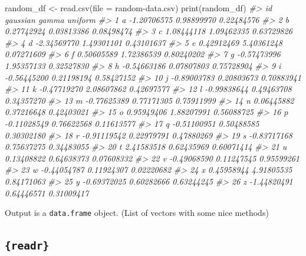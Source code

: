 \documentclass[
  12pt,
]{book}
\newenvironment{Shaded}{\begin{snugshade}}{\end{snugshade}}
\newcommand{\AttributeTok}[1]{\textcolor[rgb]{0.77,0.63,0.00}{#1}}
\newcommand{\CommentTok}[1]{\textcolor[rgb]{0.56,0.35,0.01}{\textit{#1}}}
\newcommand{\FunctionTok}[1]{\textcolor[rgb]{0.00,0.00,0.00}{#1}}
\newcommand{\NormalTok}[1]{#1}
\newcommand{\OtherTok}[1]{\textcolor[rgb]{0.56,0.35,0.01}{#1}}
\newcommand{\StringTok}[1]{\textcolor[rgb]{0.31,0.60,0.02}{#1}}
\begin{document}
\begin{Shaded}
\begin{Highlighting}[]
\NormalTok{random\_df }\OtherTok{\textless{}{-}} \FunctionTok{read.csv}\NormalTok{(}\AttributeTok{file =} \StringTok{\textquotesingle{}random{-}data.csv\textquotesingle{}}\NormalTok{)}
\FunctionTok{print}\NormalTok{(random\_df)}
\CommentTok{\#\textgreater{}    id    gaussian      gamma    uniform}
\CommentTok{\#\textgreater{} 1   a {-}1.20706575 0.98899970 0.22484576}
\CommentTok{\#\textgreater{} 2   b  0.27742924 0.03813386 0.08498474}
\CommentTok{\#\textgreater{} 3   c  1.08444118 1.09462335 0.63729826}
\CommentTok{\#\textgreater{} 4   d {-}2.34569770 1.49301101 0.43101637}
\CommentTok{\#\textgreater{} 5   e  0.42912469 5.40361248 0.07271609}
\CommentTok{\#\textgreater{} 6   f  0.50605589 1.72386539 0.80240202}
\CommentTok{\#\textgreater{} 7   g {-}0.57473996 1.95357133 0.32527830}
\CommentTok{\#\textgreater{} 8   h {-}0.54663186 0.07807803 0.75728904}
\CommentTok{\#\textgreater{} 9   i {-}0.56445200 0.21198194 0.58427152}
\CommentTok{\#\textgreater{} 10  j {-}0.89003783 0.20803673 0.70883941}
\CommentTok{\#\textgreater{} 11  k {-}0.47719270 2.08607862 0.42697577}
\CommentTok{\#\textgreater{} 12  l {-}0.99838644 0.49463708 0.34357270}
\CommentTok{\#\textgreater{} 13  m {-}0.77625389 0.77171305 0.75911999}
\CommentTok{\#\textgreater{} 14  n  0.06445882 0.37216648 0.42403021}
\CommentTok{\#\textgreater{} 15  o  0.95949406 1.88207991 0.56088725}
\CommentTok{\#\textgreater{} 16  p {-}0.11028549 0.76622568 0.11613577}
\CommentTok{\#\textgreater{} 17  q {-}0.51100951 0.50488585 0.30302180}
\CommentTok{\#\textgreater{} 18  r {-}0.91119542 0.22979791 0.47880269}
\CommentTok{\#\textgreater{} 19  s {-}0.83717168 0.75637275 0.34483055}
\CommentTok{\#\textgreater{} 20  t  2.41583518 0.62435969 0.60071414}
\CommentTok{\#\textgreater{} 21  u  0.13408822 0.64638373 0.07608332}
\CommentTok{\#\textgreater{} 22  v {-}0.49068590 0.11247545 0.95599261}
\CommentTok{\#\textgreater{} 23  w {-}0.44054787 0.11924307 0.02220682}
\CommentTok{\#\textgreater{} 24  x  0.45958944 4.91805535 0.84171063}
\CommentTok{\#\textgreater{} 25  y {-}0.69372025 0.60282666 0.63244245}
\CommentTok{\#\textgreater{} 26  z {-}1.44820491 0.64446571 0.31009417}
\end{Highlighting}
\end{Shaded}

Output is a \texttt{data.frame} object. (List of vectors with some nice methods)

\hypertarget{readr}{%
\subsection{\texorpdfstring{\texttt{\{readr\}}}{\{readr\}}}\label{readr}}
\end{document}
